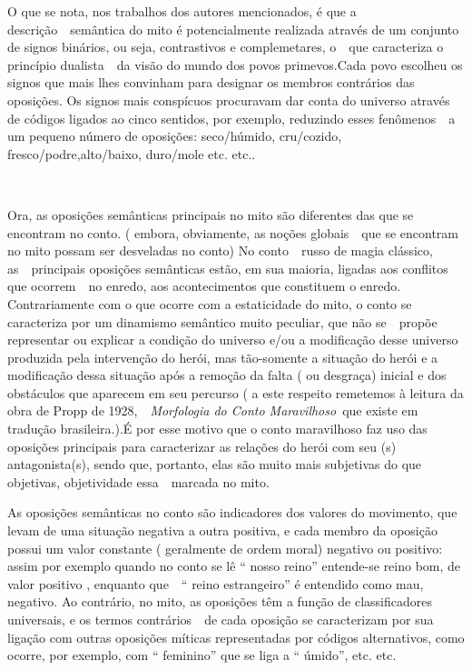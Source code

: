 O que se nota, nos trabalhos dos autores mencionados, é que a
descrição~~semântica do mito é potencialmente realizada através de um
conjunto de signos binários, ou seja, contrastivos e complemetares,
o~~que caracteriza o princípio dualista~~da visão do mundo dos povos
primevos.Cada povo escolheu os signos que mais lhes convinham para
designar os membros contrários das oposições. Os signos mais conspícuos
procuravam dar conta do universo através de códigos ligados ao cinco
sentidos, por exemplo, reduzindo esses fenômenos~~a um pequeno número de
oposições: seco/húmido, cru/cozido, fresco/podre,alto/baixo, duro/mole
etc. etc..

~

Ora, as oposições semânticas principais no mito são diferentes das que
se encontram no conto. ( embora, obviamente, as noções globais~~que se
encontram no mito possam ser desveladas no conto) No conto~~russo de
magia clássico, as~~principais oposições semânticas estão, em sua
maioria, ligadas aos conflitos que ocorrem~~no enredo, aos
acontecimentos que constituem o enredo. Contrariamente com o que ocorre
com a estaticidade do mito, o conto se caracteriza por um dinamismo
semântico muito peculiar, que não se~~propõe representar ou explicar a
condição do universo e/ou a modificação desse universo produzida pela
intervenção do herói, mas tão-somente a situação do herói e a
modificação dessa situação após a remoção da falta ( ou desgraça)
inicial e dos obstáculos que aparecem em seu percurso ( a este respeito
remetemos à leitura da obra de Propp de 1928,~~\emph{Morfologia do Conto
Maravilhoso}~que existe em tradução brasileira.).É por esse motivo que o
conto maravilhoso faz uso das oposições principais para caracterizar as
relações do herói com seu (s) antagonista(s), sendo que, portanto, elas
são muito mais subjetivas do que objetivas, objetividade essa~~marcada
no mito.

As oposições semânticas no conto são indicadores dos valores do
movimento, que levam de uma situação negativa a outra positiva, e cada
membro da oposição possui um valor constante ( geralmente de ordem
moral) negativo ou positivo: assim por exemplo quando no conto se lê ``
nosso reino'' entende-se reino bom, de valor positivo , enquanto que~~``
reino estrangeiro'' é entendido como mau, negativo. Ao contrário, no
mito, as oposições têm a função de classificadores universais, e os
termos contrários~~de cada oposição se caracterizam por sua ligação com
outras oposições míticas representadas por códigos alternativos, como
ocorre, por exemplo, com `` feminino'' que se liga a `` úmido'', etc.
etc.

